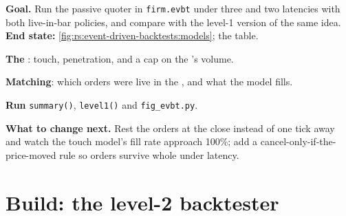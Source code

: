 \begin{tutorial}
\textbf{Goal.} Run the passive quoter in \texttt{firm.evbt} under three  and two latencies with both live-in-bar policies, and compare with
the level-1 version of the same idea. \textbf{End state:} \cref{fig:rs:event-driven-backtests:models}; the table.
\begin{tutsteps}
\item \textbf{The }: touch, penetration, and a cap on the 's volume.
\label{lst:rs:event-driven-backtests:fills}
\item \textbf{Matching}: which orders were live in the , and what the model fills.
\label{lst:rs:event-driven-backtests:match}
\item \textbf{Run} \texttt{summary()}, \texttt{level1()} and \texttt{fig\_evbt.py}.
\end{tutsteps}
\textbf{What to change next.} Rest the orders at the close instead of one tick away and watch the touch model's fill rate approach 100\%; add a
cancel-only-if-the-price-moved rule so orders survive whole  under latency.
\end{tutorial}

\section{Build: the level-2 backtester}\label{bld:rs:event-driven-backtests:evbt}

